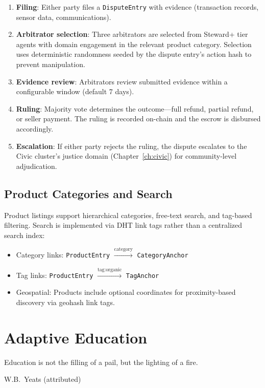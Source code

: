 \documentclass[12pt]{book}
\begin{document}
\begin{enumerate}
  \item \textbf{Filing}: Either party files a \texttt{DisputeEntry} with
    evidence (transaction records, sensor data, communications).
  \item \textbf{Arbitrator selection}: Three arbitrators are selected from
    Steward+ tier agents with domain engagement in the relevant product
    category.  Selection uses deterministic randomness seeded by the
    dispute entry's action hash to prevent manipulation.
  \item \textbf{Evidence review}: Arbitrators review submitted evidence
    within a configurable window (default 7 days).
  \item \textbf{Ruling}: Majority vote determines the outcome---full
    refund, partial refund, or seller payment.  The ruling is recorded
    on-chain and the escrow is disbursed accordingly.
  \item \textbf{Escalation}: If either party rejects the ruling, the
    dispute escalates to the Civic cluster's justice domain
    (Chapter~\ref{ch:civic}) for community-level adjudication.
\end{enumerate}

\section{Product Categories and Search}

Product listings support hierarchical categories, free-text search,
and tag-based filtering.  Search is implemented via DHT link tags
rather than a centralized search index:

\begin{itemize}
  \item Category links: \texttt{ProductEntry} $\xrightarrow{\text{category}}$ \texttt{CategoryAnchor}
  \item Tag links: \texttt{ProductEntry} $\xrightarrow{\text{tag:organic}}$ \texttt{TagAnchor}
  \item Geospatial: Products include optional coordinates for
    proximity-based discovery via geohash link tags.
\end{itemize}


\chapter{Adaptive Education}
\label{ch:edunet}

\epigraph{Education is not the filling of a pail, but the lighting of a fire.}{W.B.\ Yeats (attributed)}
\end{document}
